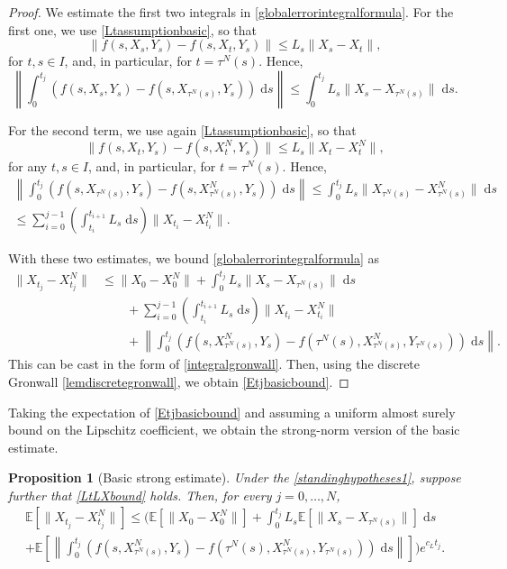 \documentclass[reqno,12pt]{amsart}
\theoremstyle{plain} %
\newtheorem{proposition}{Proposition}[section]
\theoremstyle{definition} %
\begin{document}
\begin{proof}
    We estimate the first two integrals in \eqref{globalerrorintegralformula}. For the first one, we use \eqref{Ltassumptionbasic}, so that
    $$
        \|f(s, X_s, Y_s) - f(s, X_t, Y_s)\| \leq L_s \|X_s - X_t\|,
    $$
    for $t, s \in I$, and, in particular, for $t = \tau^N(s)$. Hence,
    $$
        \left\|\int_0^{t_j} \left( f(s, X_s, Y_s) - f(s, X_{\tau^N(s)}, Y_s) \right)\;\mathrm{d}s \right\| \leq \int_0^{t_j} L_s \|X_s - X_{\tau^N(s)}\| \;\mathrm{d}s.
    $$
    
    For the second term, we use again \eqref{Ltassumptionbasic}, so that
    $$
        \|f(s, X_t, Y_s) - f(s, X_t^N, Y_s)\| \leq L_s \|X_t - X_t^N\|,
    $$
    for any $t, s \in I$, and, in particular, for $t = \tau^N(s)$. Hence,
    \begin{multline*}
        \left\|\int_0^{t_j} \left( f(s, X_{\tau^N(s)}, Y_s) - f(s, X_{\tau^N(s)}^N, Y_s) \right)\;\mathrm{d}s \right\| \leq \int_0^{t_j} L_s \|X_{\tau^N(s)} - X_{\tau^N(s)}^N\| \;\mathrm{d}s \\
        \leq \sum_{i=0}^{j-1} \left(\int_{t_i}^{t_{i+1}}L_s\;\mathrm{d}s \right) \|X_{t_i} - X_{t_i}^N\|.
    \end{multline*}
    
    With these two estimates, we bound \eqref{globalerrorintegralformula} as
    \begin{align*}
        \|X_{t_j} - X_{t_j}^N\| & \leq \|X_0 - X_0^N\| + \int_0^{t_j} L_s \|X_s - X_{\tau^N(s)}\| \;\mathrm{d}s \\
        & \qquad + \sum_{i=0}^{j-1} \left(\int_{t_i}^{t_{i+1}}L_s\;\mathrm{d}s \right) \|X_{t_i} - X_{t_i}^N\| \\
        & \qquad + \left\|\int_0^{t_j} \left( f(s, X_{\tau^N(s)}^N, Y_s) - f(\tau^N(s), X_{\tau^N(s)}^N, Y_{\tau^N(s)}) \right)\;\mathrm{d}s\right\|.
    \end{align*}
    This can be cast in the form of \eqref{integralgronwall}. Then, using the discrete Gronwall \cref{lemdiscretegronwall}, we obtain \eqref{Etjbasicbound}.
\end{proof}

Taking the expectation of \eqref{Etjbasicbound} and assuming a uniform almost surely bound on the Lipschitz coefficient, we obtain the strong-norm version of the basic estimate.
\begin{proposition}[Basic strong estimate]
    \label{propbasicstrongestimate}
    Under the \cref{standinghypotheses1}, suppose further that \eqref{LtLXbound} holds. Then, for every $j = 0, \ldots, N$,
    \begin{multline}
        \label{expectedestimateglobalerrorintegral}
        \mathbb{E}\left[\|X_{t_j} - X_{t_j}^N\|\right] \leq \Bigg( \mathbb{E}\left[\|X_0 - X_0^N\|\right] + \int_0^{t_j} L_s \mathbb{E}\left[\|X_s - X_{\tau^N(s)}\|\right] \;\mathrm{d}s \\
        + \mathbb{E}\left[\left\|\int_0^{t_j} \left( f(s, X_{\tau^N(s)}^N, Y_s) - f(\tau^N(s), X_{\tau^N(s)}^N, Y_{\tau^N(s)}) \right)\;\mathrm{d}s\right\|\right]\Bigg) e^{c_L t_j}.
    \end{multline}
\end{proposition}
\end{document}

